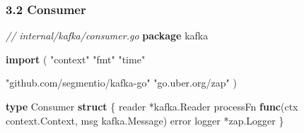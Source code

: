 \documentclass[
]{article}
\newenvironment{Shaded}{}{}
\newcommand{\CommentTok}[1]{\textcolor[rgb]{0.38,0.63,0.69}{\textit{#1}}}
\newcommand{\DataTypeTok}[1]{\textcolor[rgb]{0.56,0.13,0.00}{#1}}
\newcommand{\KeywordTok}[1]{\textcolor[rgb]{0.00,0.44,0.13}{\textbf{#1}}}
\newcommand{\NormalTok}[1]{#1}
\newcommand{\OperatorTok}[1]{\textcolor[rgb]{0.40,0.40,0.40}{#1}}
\newcommand{\StringTok}[1]{\textcolor[rgb]{0.25,0.44,0.63}{#1}}
\begin{document}
\hypertarget{consumer}{%
\subsubsection{3.2 Consumer}\label{consumer}}

\begin{Shaded}
\begin{Highlighting}[]
\CommentTok{// internal/kafka/consumer.go}
\KeywordTok{package}\NormalTok{ kafka}

\KeywordTok{import} \OperatorTok{(}
    \StringTok{"context"}
    \StringTok{"fmt"}
    \StringTok{"time"}

    \StringTok{"github.com/segmentio/kafka{-}go"}
    \StringTok{"go.uber.org/zap"}
\OperatorTok{)}

\KeywordTok{type}\NormalTok{ Consumer }\KeywordTok{struct} \OperatorTok{\{}
\NormalTok{    reader    }\OperatorTok{*}\NormalTok{kafka}\OperatorTok{.}\NormalTok{Reader}
\NormalTok{    processFn }\KeywordTok{func}\OperatorTok{(}\NormalTok{ctx context}\OperatorTok{.}\NormalTok{Context}\OperatorTok{,}\NormalTok{ msg kafka}\OperatorTok{.}\NormalTok{Message}\OperatorTok{)} \DataTypeTok{error}
\NormalTok{    logger    }\OperatorTok{*}\NormalTok{zap}\OperatorTok{.}\NormalTok{Logger}
\OperatorTok{\}}


\end{Highlighting}
\end{Shaded}
\end{document}
